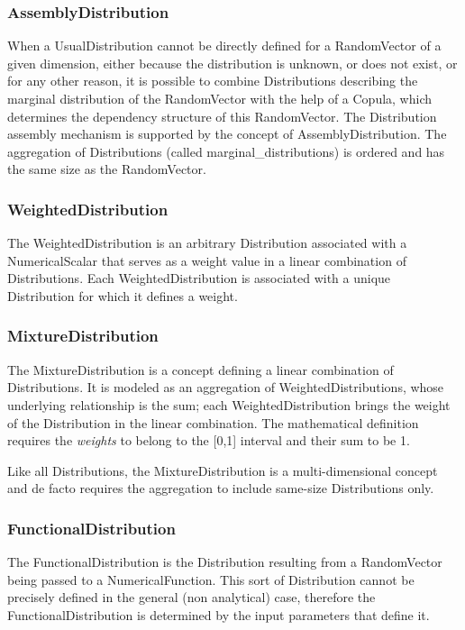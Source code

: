 \subsubsection{AssemblyDistribution}

When a UsualDistribution cannot be directly defined for a RandomVector of a given dimension, either because the distribution is unknown, or does not exist, or for any other reason, it is possible to combine Distributions describing the marginal distribution of the RandomVector with the help of a Copula, which determines the dependency structure of this RandomVector. The Distribution assembly mechanism is supported by the concept of AssemblyDistribution. The aggregation of Distributions (called marginal\_distributions) is ordered and has the same size as the RandomVector.

\subsubsection{WeightedDistribution}

The WeightedDistribution is an arbitrary Distribution associated with a NumericalScalar that serves as a weight value in a linear combination of Distributions. Each WeightedDistribution is associated with a unique Distribution for which it defines a weight.

\subsubsection{MixtureDistribution}

The MixtureDistribution is a concept defining a linear combination of Distributions. It is modeled as an aggregation of WeightedDistributions, whose underlying relationship is the sum; each WeightedDistribution brings the weight of the Distribution in the linear combination. The mathematical definition requires the \emph{weights} to belong to the [0,1] interval and their sum to be 1.

Like all Distributions, the MixtureDistribution is a multi-dimensional concept and de facto requires the aggregation to include same-size Distributions only.

\subsubsection{FunctionalDistribution}

The FunctionalDistribution is the Distribution resulting from a RandomVector being passed to a NumericalFunction. This sort of Distribution cannot be precisely defined in the general (non analytical) case, therefore the FunctionalDistribution is determined by the input parameters that define it.

